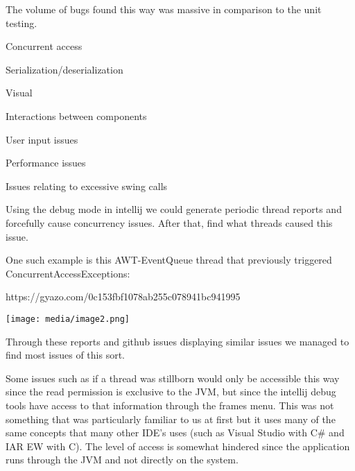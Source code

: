 \documentclass[]{article}
\begin{document}
The volume of bugs found this way was massive in comparison to the unit
testing.

Concurrent access

Serialization/deserialization

Visual

Interactions between components

User input issues

Performance issues

Issues relating to excessive swing calls

Using the debug mode in intellij we could generate periodic thread
reports and forcefully cause concurrency issues. After that, find what
threads caused this issue.

One such example is this AWT-EventQueue thread that previously triggered
ConcurrentAccessExceptions:

https://gyazo.com/0c153fbf1078ab255c078941bc941995

\texttt{[image: media/image2.png]}

Through these reports and github issues displaying similar issues we
managed to find most issues of this sort.

Some issues such as if a thread was stillborn would only be accessible
this way since the read permission is exclusive to the JVM, but since
the intellij debug tools have access to that information through the
frames menu. This was not something that was particularly familiar to us
at first but it uses many of the same concepts that many other IDE's
uses (such as Visual Studio with C\# and IAR EW with C). The level of
access is somewhat hindered since the application runs through the JVM
and not directly on the system.
\end{document}

